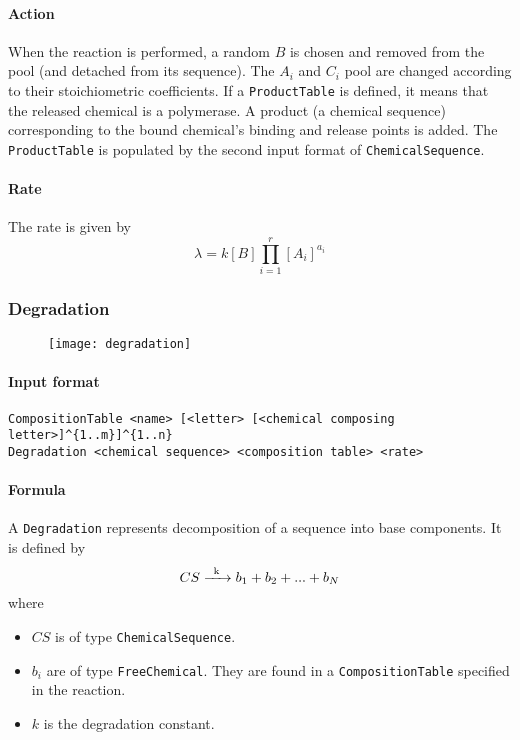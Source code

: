 \paragraph{Action} When the reaction is performed, a random $B$ is chosen and removed from the pool (and detached from its sequence). The $A_i$ and $C_i$ pool are changed according to their stoichiometric coefficients. If a \texttt{ProductTable} is defined, it means that the released chemical is a polymerase. A product (a chemical sequence) corresponding to the bound chemical's binding and release points is added. The \texttt{ProductTable} is populated by the second input format of \texttt{ChemicalSequence}.

\paragraph{Rate} The rate is given by
$$
	\lambda = k[B]\prod\limits_{i=1}^{r}[A_i]^{a_i}
$$

\subsubsection{Degradation}

\begin{figure}[!ht]
	\centering
	\texttt{[image: degradation]}
\end{figure}

\paragraph{Input format}
\begin{verbatim}
CompositionTable <name> [<letter> [<chemical composing letter>]^{1..m}]^{1..n}
Degradation <chemical sequence> <composition table> <rate>	
\end{verbatim}

\paragraph{Formula} A \texttt{Degradation} represents decomposition of a sequence into base components. It is defined by
$$
	\reactionIrr{CS}{b_1 + b_2 + ... + b_N}{k}{}
$$
where
\begin{itemize}
	\item $CS$ is of type \texttt{ChemicalSequence}.
	\item $b_i$ are of type \texttt{FreeChemical}. They are found in a \texttt{CompositionTable} specified in the reaction.
	\item $k$ is the degradation constant.
\end{itemize}

